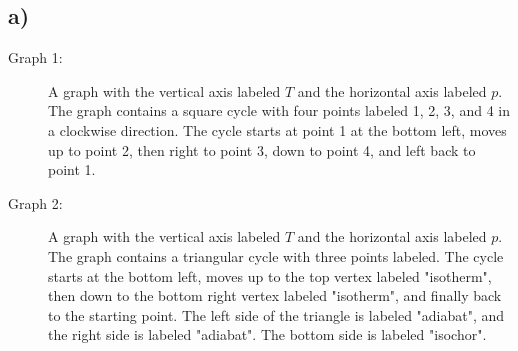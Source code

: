 

\subsection*{a)}

\begin{description}
    \item[Graph 1:] A graph with the vertical axis labeled \( T \) and the horizontal axis labeled \( p \). The graph contains a square cycle with four points labeled 1, 2, 3, and 4 in a clockwise direction. The cycle starts at point 1 at the bottom left, moves up to point 2, then right to point 3, down to point 4, and left back to point 1.
\end{description}

\begin{description}
    \item[Graph 2:] A graph with the vertical axis labeled \( T \) and the horizontal axis labeled \( p \). The graph contains a triangular cycle with three points labeled. The cycle starts at the bottom left, moves up to the top vertex labeled "isotherm", then down to the bottom right vertex labeled "isotherm", and finally back to the starting point. The left side of the triangle is labeled "adiabat", and the right side is labeled "adiabat". The bottom side is labeled "isochor".
\end{description}